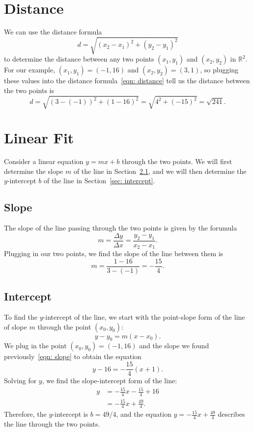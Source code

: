 \documentclass{article}
\begin{document}
   
   
\section{Distance}
\label{sec: distance}
We can use the distance formula
\begin{equation}
\label{eqn: distance}
	d = \sqrt{(x_2 - x_1)^2 + (y_2 - y_1)^2}
\end{equation}
to determine the distance between any two points $(x_1, y_1)$ and $(x_2, y_2)$
in $\mathbb{R}^2$.  For our example, $(x_1, y_1) = (-1, 16)$ and $(x_2, y_2) =
(3, 1)$, so plugging these values into the distance formula~\eqref{eqn:
distance} tell us the distance between the two points is
$$
	d 
	= \sqrt{(3 - (-1))^2 + (1 - 16)^2}
	= \sqrt{4^2 + (-15)^2}
	= \sqrt{241}
	.
$$

\section{Linear Fit}
\label{sec: linear fit}
Consider a linear equation $y = m x + b$ through the two points.  We will
first determine the slope $m$ of the line in Section~\ref{sec: slope}, and we
will then determine the $y$-intercept $b$ of the line in Section~\ref{sec:
intercept}.

\subsection{Slope}
\label{sec: slope}

The slope of the line passing through the two points is given by the forumula
$$
	m 
	= \frac{\Delta y}{\Delta x} 
	= \frac{y_2 - y_1}{x_2 - x_1}
	.
$$
Plugging in our two points, we find the slope of the line between them is
\begin{equation}
\label{eqn: slope}
	m 
	= \frac{1 - 16}{3 - (-1)}
	= - \frac{15}{4}
	.
\end{equation}

\subsection{Intercept}
\label{sec: intercept}

To find the $y$-intercept of the line, we start with the point-slope form of
the line of slope $m$ through the point $(x_0, y_0)$:
$$
	y - y_0 = m (x - x_0)
	.
$$
We plug in the point $(x_0, y_0) = (-1, 16)$ and the slope we found
previously~\eqref{eqn: slope} to obtain the equation
$$
	y - 16 = - \frac{15}{4} (x + 1)
	.
$$
Solving for $y$, we find the slope-intercept form of the line:
\begin{align*}
	y 
	&= - \frac{15}{4} x - \frac{15}{4} + 16 \\
	&= - \frac{15}{4} x + \frac{49}{4}
	.
\end{align*}
Therefore, the $y$-intercept is $b = 49/4$, and the equation 
$y = - \frac{15}{4} x + \frac{49}{4}$ describes the line through the two
points.
\end{document}
